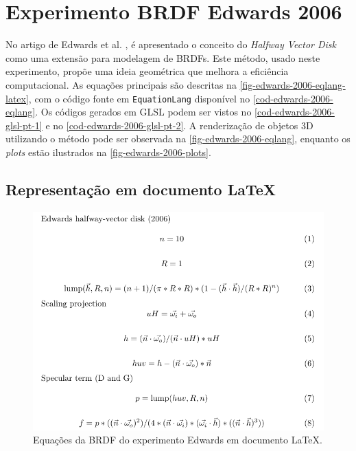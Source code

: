 
\section{Experimento BRDF Edwards 2006}
\label{section-experiment-edwards-2006}

No artigo de Edwards et al. \cite{edwards2006halfway}, é apresentado o conceito do \textit{Halfway Vector Disk} como uma extensão para modelagem de BRDFs. Este método, usado neste experimento, propõe uma ideia geométrica que melhora a eficiência computacional. As equações principais são descritas na \autoref{fig-edwards-2006-eqlang-latex}, com o código fonte em \texttt{EquationLang} disponível no \autoref{cod-edwards-2006-eqlang}. Os códigos gerados em GLSL podem ser vistos no \autoref{cod-edwards-2006-glsl-pt-1} e no \autoref{cod-edwards-2006-glsl-pt-2}. A renderização de objetos 3D utilizando o método pode ser observada na \autoref{fig-edwards-2006-eqlang}, enquanto os \textit{plots} estão ilustrados na \autoref{fig-edwards-2006-plots}.

\subsection{Representação em documento \LaTeX{}}
\begin{figure}[H]
    \caption{\label{fig-edwards-2006-eqlang-latex} \small Equações da BRDF do experimento Edwards em documento \LaTeX{}.}
    \begin{center}
        \includegraphics[scale=0.92]{./Imagens/brdfs/edwards-2006.pdf}
    \end{center}
\end{figure}

